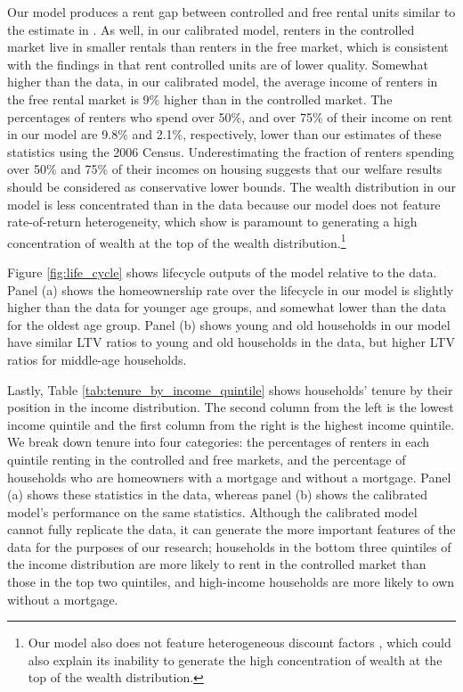 \documentclass[parskip=full]{article}
\begin{document}
Our model produces a rent gap between controlled and free rental units similar to the estimate in \citet{zhang-gou}. As well, in our calibrated model, renters in the controlled market live in smaller rentals than renters in the free market, which is consistent with the findings in \citet{zhang-gou} that rent controlled units are of lower quality. Somewhat higher than the data, in our calibrated model, the average income of renters in the free rental market is 9\% higher than in the controlled market. The percentages of renters who spend over 50\%, and over 75\% of their income on rent in our model are 9.8\% and 2.1\%, respectively, lower than our estimates of these statistics using the 2006 Census. Underestimating the fraction of renters spending over 50\% and 75\% of their incomes on housing suggests that our welfare results should be considered as conservative lower bounds. The wealth distribution in our model is less concentrated than in the data because our model does not feature rate-of-return heterogeneity, which \citet{fagereng} show is paramount to generating a high concentration of wealth at the top of the wealth distribution.\footnote{Our model also does not feature heterogeneous discount factors \citep{ks-1998}, which could also explain its inability to generate the high concentration of wealth at the top of the wealth distribution.}

Figure \ref{fig:life_cycle} shows lifecycle outputs of the model relative to the data. Panel (a) shows the homeownership rate over the lifecycle in our model is slightly higher than the data for younger age groups, and somewhat lower than the data for the oldest age group. Panel (b) shows young and old households in our model have similar LTV ratios to young and old households in the data, but higher LTV ratios for middle-age households. 

Lastly, Table \ref{tab:tenure_by_income_quintile} shows households' tenure by their position in the income distribution. The second column from the left is the lowest income quintile and the first column from the right is the highest income quintile. We break down tenure into four categories: the percentages of renters in each quintile renting in the controlled and free markets, and the percentage of households who are homeowners with a mortgage and without a mortgage. Panel (a) shows these statistics in the data, whereas panel (b) shows the calibrated model's performance on the same statistics. Although the calibrated model cannot fully replicate the data, it can generate the more important features of the data for the purposes of our research; households in the bottom three quintiles of the income distribution are more likely to rent in the controlled market than those in the top two quintiles, and high-income households are more likely to own without a mortgage.
\end{document}
